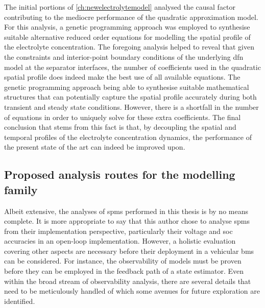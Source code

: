 The initial portions of \cref{ch:newelectrolytemodel} analysed the causal factor
contributing to the mediocre performance of the quadratic approximation model.
For this analysis, a genetic programming approach was employed to synthesise
suitable alternative reduced order equations for modelling the spatial profile
of the electrolyte concentration. The foregoing analysis helped to reveal that
given the constraints and interior-point boundary conditions of the underlying
\gls{dfn} model at the separator interfaces, the number of coefficients used in
the quadratic spatial profile does indeed make the best use of all available
equations. The genetic programming approach being able to synthesise suitable
mathematical structures that can potentially capture the spatial profile
accurately during both transient and steady state conditions. However, there is
a shortfall in the number of equations in order to uniquely solve for these
extra coefficients. The final conclusion that stems from this fact is that, by decoupling
the spatial and temporal profiles of the electrolyte concentration dynamics, the
performance of the present state of the art can indeed be improved upon.


\subsection{Proposed analysis routes for the  modelling family}

Albeit extensive, the analyses of \glspl{spm}  performed in this thesis is by no
means complete. It is more appropriate to  say that this author chose to analyse
\glspl{spm} from  their implementation  perspective, particularly  their voltage
and \gls{soc}  accuracies in  an open-loop  implementation. However,  a holistic
evaluation covering  other aspects  are necessary before  their deployment  in a
vehicular \gls{bms} can be considered. For instance, the observability of models
must be  proven before  they can  be employed in  the feedback  path of  a state
estimator. Even  within the  broad stream of  observability analysis,  there are
several details that  need to be meticulously handled of  which some avenues for
future exploration are identified.

